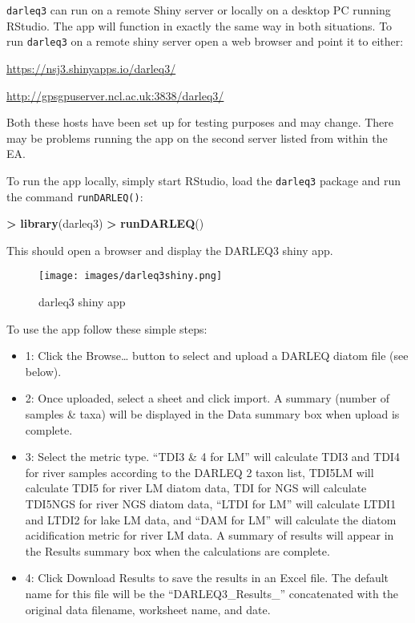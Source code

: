 \documentclass[]{article}
\newenvironment{Shaded}{\begin{snugshade}}{\end{snugshade}}
\newcommand{\KeywordTok}[1]{\textcolor[rgb]{0.13,0.29,0.53}{\textbf{#1}}}
\newcommand{\StringTok}[1]{\textcolor[rgb]{0.31,0.60,0.02}{#1}}
\newcommand{\OperatorTok}[1]{\textcolor[rgb]{0.81,0.36,0.00}{\textbf{#1}}}
\newcommand{\NormalTok}[1]{#1}
\begin{document}
\texttt{darleq3} can run on a remote Shiny server or locally on a
desktop PC running RStudio. The app will function in exactly the same
way in both situations. To run \texttt{darleq3} on a remote shiny server
open a web browser and point it to either:

\url{https://nsj3.shinyapps.io/darleq3/}

\url{http://gpsgpuserver.ncl.ac.uk:3838/darleq3/}

Both these hosts have been set up for testing purposes and may change.
There may be problems running the app on the second server listed from
within the EA.

To run the app locally, simply start RStudio, load the \texttt{darleq3}
package and run the command \texttt{runDARLEQ()}:

\begin{Shaded}
\begin{Highlighting}[]
\OperatorTok{>}\StringTok{ }\KeywordTok{library}\NormalTok{(darleq3)}
\OperatorTok{>}\StringTok{ }\KeywordTok{runDARLEQ}\NormalTok{()}
\end{Highlighting}
\end{Shaded}

This should open a browser and display the DARLEQ3 shiny app.

\begin{figure}
\centering
\texttt{[image: images/darleq3shiny.png]}
\caption{darleq3 shiny app}
\end{figure}

To use the app follow these simple steps:

\begin{itemize}
\item
  1: Click the Browse\ldots{} button to select and upload a DARLEQ
  diatom file (see below).
\item
  2: Once uploaded, select a sheet and click import. A summary (number
  of samples \& taxa) will be displayed in the Data summary box when
  upload is complete.
\item
  3: Select the metric type. ``TDI3 \& 4 for LM'' will calculate TDI3
  and TDI4 for river samples according to the DARLEQ 2 taxon list,
  TDI5LM will calculate TDI5 for river LM diatom data, TDI for NGS will
  calculate TDI5NGS for river NGS diatom data, ``LTDI for LM'' will
  calculate LTDI1 and LTDI2 for lake LM data, and ``DAM for LM'' will
  calculate the diatom acidification metric for river LM data. A summary
  of results will appear in the Results summary box when the
  calculations are complete.
\item
  4: Click Download Results to save the results in an Excel file. The
  default name for this file will be the ``DARLEQ3\_Results\_''
  concatenated with the original data filename, worksheet name, and
  date.
\end{itemize}
\end{document}
